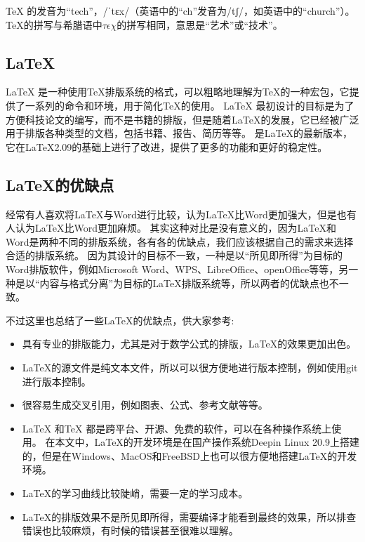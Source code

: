 \documentclass{suesreport}
\begin{document}
    \TeX{} 的发音为“tech”，/ˈtɛx/（英语中的“ch”发音为/tʃ/，如英语中的“church”）。\TeX{}的拼写与希腊语中$\tau\epsilon\chi$的拼写相同，意思是“艺术”或“技术”。

    \subsection{\LaTeX{}}
    \LaTeX{} 是一种使用\TeX{}排版系统的格式，可以粗略地理解为\TeX{}的一种宏包，它提供了一系列的命令和环境，用于简化\TeX{}的使用。
    \LaTeX{} 最初设计的目标是为了方便科技论文的编写，而不是书籍的排版，但是随着\LaTeX{}的发展，它已经被广泛用于排版各种类型的文档，包括书籍、报告、简历等等。
    \LaTeXe{} 是\LaTeX{}的最新版本，它在\LaTeX{}2.09的基础上进行了改进，提供了更多的功能和更好的稳定性。

    \subsection{\LaTeX{}的优缺点}
    经常有人喜欢将\LaTeX{}与Word进行比较，认为\LaTeX{}比Word更加强大，但是也有人认为\LaTeX{}比Word更加麻烦。
    其实这种对比是没有意义的，因为\LaTeX{}和Word是两种不同的排版系统，各有各的优缺点，我们应该根据自己的需求来选择合适的排版系统。
    因为其设计的目标不一致，一种是以“所见即所得”为目标的Word排版软件，例如Microsoft Word、WPS、LibreOffice、openOffice等等，另一种是以“内容与格式分离”为目标的\LaTeX{}排版系统等，所以两者的优缺点也不一致。

    不过这里也总结了一些\LaTeX{}的优缺点，供大家参考:
    \begin{itemize}
        \item 具有专业的排版能力，尤其是对于数学公式的排版，\LaTeX{}的效果更加出色。
        \item \LaTeX{}的源文件是纯文本文件，所以可以很方便地进行版本控制，例如使用git进行版本控制。
        \item 很容易生成交叉引用，例如图表、公式、参考文献等等。
        \item \LaTeX{} 和\TeX{} 都是跨平台、开源、免费的软件，可以在各种操作系统上使用。
        在本文中，\LaTeX{}的开发环境是在国产操作系统Deepin Linux 20.9上搭建的，但是在Windows、MacOS和FreeBSD上也可以很方便地搭建\LaTeX{}的开发环境。
        \item \LaTeX{}的学习曲线比较陡峭，需要一定的学习成本。
        \item \LaTeX{}的排版效果不是所见即所得，需要编译才能看到最终的效果，所以排查错误也比较麻烦，有时候的错误甚至很难以理解。
    \end{itemize}
\end{document}
